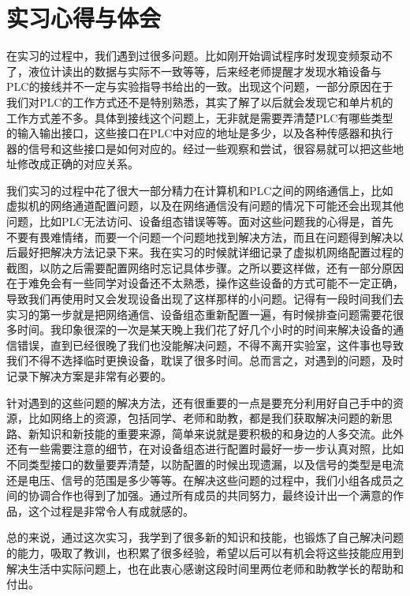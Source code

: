 \documentclass[UTF8]{article}
\begin{document}
%
\section{实习心得与体会}

在实习的过程中，我们遇到过很多问题。比如刚开始调试程序时发现变频泵动不了，液位计读出的数据与实际不一致等等，后来经老师提醒才发现水箱设备与PLC的接线并不一定与实验指导书给出的一致。出现这个问题，一部分原因在于我们对PLC的工作方式还不是特别熟悉，其实了解了以后就会发现它和单片机的工作方式差不多。具体到接线这个问题上，无非就是需要弄清楚PLC有哪些类型的输入输出接口，这些接口在PLC中对应的地址是多少，以及各种传感器和执行器的信号和这些接口是如何对应的。经过一些观察和尝试，很容易就可以把这些地址修改成正确的对应关系。

我们实习的过程中花了很大一部分精力在计算机和PLC之间的网络通信上，比如虚拟机的网络通道配置问题，以及在网络通信没有问题的情况下可能还会出现其他问题，比如PLC无法访问、设备组态错误等等。面对这些问题我的心得是，首先不要有畏难情绪，而要一个问题一个问题地找到解决方法，而且在问题得到解决以后最好把解决方法记录下来。我在实习的时候就详细记录了虚拟机网络配置过程的截图，以防之后需要配置网络时忘记具体步骤。之所以要这样做，还有一部分原因在于难免会有一些同学对设备还不太熟悉，操作这些设备的方式可能不一定正确，导致我们再使用时又会发现设备出现了这样那样的小问题。记得有一段时间我们去实习的第一步就是把网络通信、设备组态重新配置一遍，有时候排查问题需要花很多时间。我印象很深的一次是某天晚上我们花了好几个小时的时间来解决设备的通信错误，直到已经很晚了我们也没能解决问题，不得不离开实验室，这件事也导致我们不得不选择临时更换设备，耽误了很多时间。总而言之，对遇到的问题，及时记录下解决方案是非常有必要的。

针对遇到的这些问题的解决方法，还有很重要的一点是要充分利用好自己手中的资源，比如网络上的资源，包括同学、老师和助教，都是我们获取解决问题的新思路、新知识和新技能的重要来源，简单来说就是要积极的和身边的人多交流。此外还有一些需要注意的细节，在对设备组态进行配置时最好一步一步认真对照，比如不同类型接口的数量要弄清楚，以防配置的时候出现遗漏，以及信号的类型是电流还是电压、信号的范围是多少等等。在解决这些问题的过程中，我们小组各成员之间的协调合作也得到了加强。通过所有成员的共同努力，最终设计出一个满意的作品，这个过程是非常令人有成就感的。

总的来说，通过这次实习，我学到了很多新的知识和技能，也锻炼了自己解决问题的能力，吸取了教训，也积累了很多经验，希望以后可以有机会将这些技能应用到解决生活中实际问题上，也在此衷心感谢这段时间里两位老师和助教学长的帮助和付出。
\end{document}

